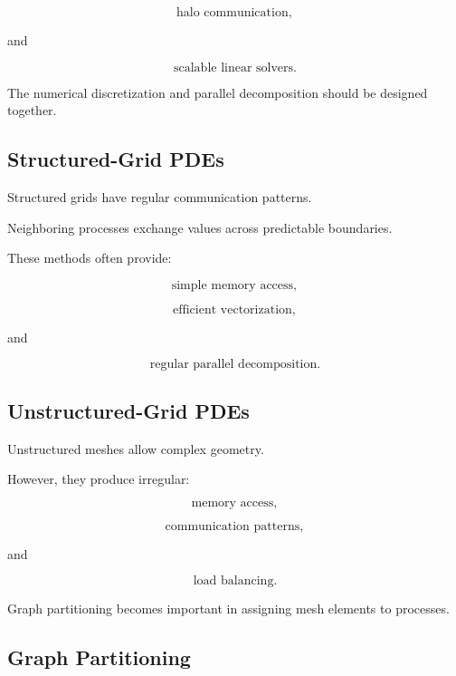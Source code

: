 \[
\boxed{
\text{halo communication},
}
\]

and

\[
\boxed{
\text{scalable linear solvers}.
}
\]

The numerical discretization and parallel decomposition should be designed
together.

\subsection{Structured-Grid PDEs}
\label{subsec:hpmc-structured-grid-pdes}

Structured grids have regular communication patterns.

Neighboring processes exchange values across predictable boundaries.

These methods often provide:

\[
\boxed{
\text{simple memory access},
}
\]

\[
\boxed{
\text{efficient vectorization},
}
\]

and

\[
\boxed{
\text{regular parallel decomposition}.
}
\]

\subsection{Unstructured-Grid PDEs}
\label{subsec:hpmc-unstructured-grid-pdes}

Unstructured meshes allow complex geometry.

However, they produce irregular:

\[
\boxed{
\text{memory access},
}
\]

\[
\boxed{
\text{communication patterns},
}
\]

and

\[
\boxed{
\text{load balancing}.
}
\]

Graph partitioning becomes important in assigning mesh elements to
processes.

\subsection{Graph Partitioning}
\label{subsec:hpmc-graph-partitioning}

